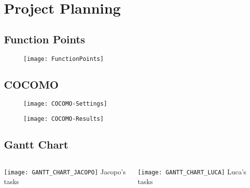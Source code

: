 \section{Project Planning}
\subsection{Function Points}

\begin{frame}{\currentname}

\begin{figure}[H]
\texttt{[image: FunctionPoints]}
\centering
\end{figure}

\end{frame}

\subsection{COCOMO}

\begin{frame}{\currentname}

\begin{figure}[H]
\texttt{[image: COCOMO-Settings]}
\centering
\end{figure}

\end{frame}
\begin{frame}{\currentname}

\begin{figure}[H]
\texttt{[image: COCOMO-Results]}
\centering
\end{figure}

\end{frame}

\subsection{Gantt Chart}
\begin{frame}{\currentname{}}
\begin{columns}[c]
  \begin{column}{.5\textwidth}
	    \texttt{[image: GANTT\_CHART\_JACOPO]}
		\centering
		\newline
		Jacopo's tasks
  \end{column}
  \begin{column}{.5\textwidth}
    \texttt{[image: GANTT\_CHART\_LUCA]}
		\centering
		\newline
		Luca's tasks
  \end{column}
\end{columns}
\end{frame}